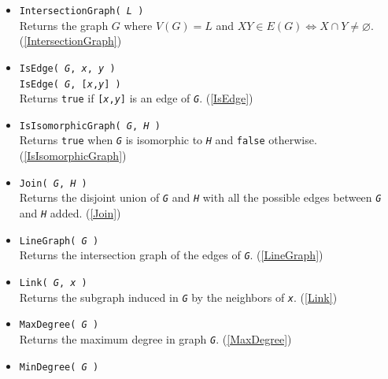 \documentclass[a4paper,11pt]{report}
\begin{document}
{{\begin{itemize}
 Returns the list of in-neighbors of \mbox{\texttt{\mdseries\slshape x}} in \mbox{\texttt{\mdseries\slshape G}}. (\ref{InNeigh}) 
\item \texttt{IntersectionGraph( \mbox{\texttt{\mdseries\slshape L}} )}\\
 Returns the graph $G$ where $V(G)=L$ and $XY\in E(G) \iff X\cap Y \neq \varnothing$. (\ref{IntersectionGraph}) 
\item \texttt{IsEdge( \mbox{\texttt{\mdseries\slshape G}}, \mbox{\texttt{\mdseries\slshape x}}, \mbox{\texttt{\mdseries\slshape y}} )}\\
 \texttt{IsEdge( \mbox{\texttt{\mdseries\slshape G}}, [\mbox{\texttt{\mdseries\slshape x}},\mbox{\texttt{\mdseries\slshape y}}] )}\\
 Returns \texttt{true} if \texttt{[\mbox{\texttt{\mdseries\slshape x}},\mbox{\texttt{\mdseries\slshape y}}]} is an edge of \mbox{\texttt{\mdseries\slshape G}}. (\ref{IsEdge}) 
\item \texttt{IsIsomorphicGraph( \mbox{\texttt{\mdseries\slshape G}}, \mbox{\texttt{\mdseries\slshape H}} )}\\
 Returns \texttt{true} when \mbox{\texttt{\mdseries\slshape G}} is isomorphic to \mbox{\texttt{\mdseries\slshape H}} and \texttt{false} otherwise. (\ref{IsIsomorphicGraph}) 
\item \texttt{Join( \mbox{\texttt{\mdseries\slshape G}}, \mbox{\texttt{\mdseries\slshape H}} )}\\
 Returns the disjoint union of \mbox{\texttt{\mdseries\slshape G}} and \mbox{\texttt{\mdseries\slshape H}} with all the possible edges between \mbox{\texttt{\mdseries\slshape G}} and \mbox{\texttt{\mdseries\slshape H}} added. (\ref{Join}) 
\item \texttt{LineGraph( \mbox{\texttt{\mdseries\slshape G}} )}\\
 Returns the intersection graph of the edges of \mbox{\texttt{\mdseries\slshape G}}. (\ref{LineGraph}) 
\item \texttt{Link( \mbox{\texttt{\mdseries\slshape G}}, \mbox{\texttt{\mdseries\slshape x}} )}\\
 Returns the subgraph induced in \mbox{\texttt{\mdseries\slshape G}} by the neighbors of \mbox{\texttt{\mdseries\slshape x}}. (\ref{Link}) 
\item \texttt{MaxDegree( \mbox{\texttt{\mdseries\slshape G}} )}\\
 Returns the maximum degree in graph \mbox{\texttt{\mdseries\slshape G}}. (\ref{MaxDegree}) 
\item \texttt{MinDegree( \mbox{\texttt{\mdseries\slshape G}} )}\\

\end{itemize}}}
\end{document}
